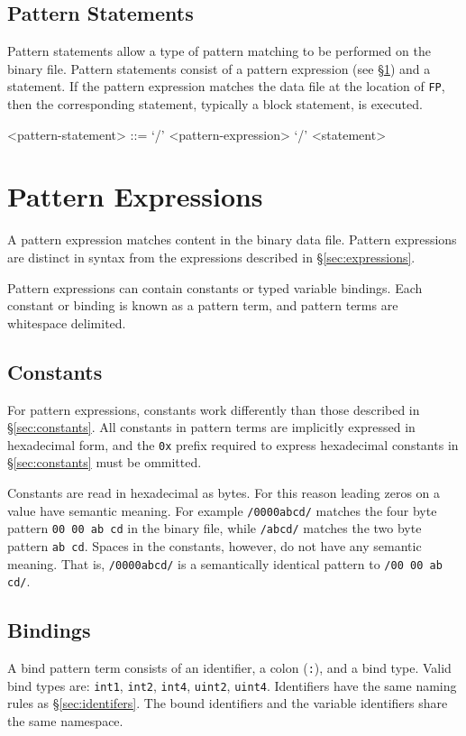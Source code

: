 \documentclass[letterpaper]{article}
\begin{document}
\subsection{Pattern Statements}
Pattern statements allow a type of pattern matching to be performed on the binary file.  Pattern statements consist of a pattern expression (see \S\ref{sec:pattern-expressions}) and a statement.  If the pattern expression matches the data file at the location of \texttt{FP}, then the corresponding statement, typically a block statement, is executed.
\begin{grammar}
<pattern-statement> ::= `/' <pattern-expression> `/' <statement>
\end{grammar}

\section{Pattern Expressions}
\label{sec:pattern-expressions}
A pattern expression matches content in the binary data file.  Pattern expressions are distinct in syntax from the expressions described in \S\ref{sec:expressions}.

Pattern expressions can contain constants or typed variable bindings.  Each constant or binding is known as a pattern term, and pattern terms are whitespace delimited.

\subsection{Constants}
\label{sec:pattern-constants}
For pattern expressions, constants work differently than those described in \S\ref{sec:constants}.  All constants in pattern terms are implicitly expressed in hexadecimal form, and the \texttt{0x} prefix required to express hexadecimal constants in \S\ref{sec:constants} must be ommitted.

Constants are read in hexadecimal as bytes.  For this reason leading zeros on a value have semantic meaning.  For example \texttt{/0000abcd/} matches the four byte pattern \texttt{00 00 ab cd} in the binary file, while \texttt{/abcd/} matches the two byte pattern \texttt{ab cd}.  Spaces in the constants, however, do not have any semantic meaning.  That is, \texttt{/0000abcd/} is a semantically identical pattern to \texttt{/00 00 ab cd/}.
 
\subsection{Bindings}
A bind pattern term consists of an identifier, a colon (\texttt{:}), and a bind type.  Valid bind types are: \texttt{int1}, \texttt{int2}, \texttt{int4}, \texttt{uint2}, \texttt{uint4}.  Identifiers have the same naming rules as \S\ref{sec:identifers}.  The bound identifiers and the variable identifiers share the same namespace.
\end{document}
